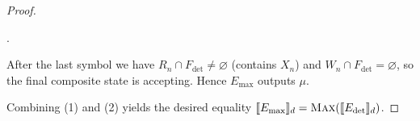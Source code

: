 \begin{proof}
\begin{itemize}
		.
	\end{itemize}
	
	After the last symbol we have
	\(R_{n}\cap F_{\det}\neq\varnothing\) (contains \(X_{n}\))
	and \(W_{n}\cap F_{\det}=\varnothing\), so the final composite state
	is accepting.  Hence \(E_{\max}\) outputs \(\mu\).
	
	\medskip
	Combining (1) and (2) yields the desired equality
	\(\llbracket E_{\max}\rrbracket_{d} = \textsc{Max}(
	\llbracket E_{\det}\rrbracket_{d})\).
\end{proof}
